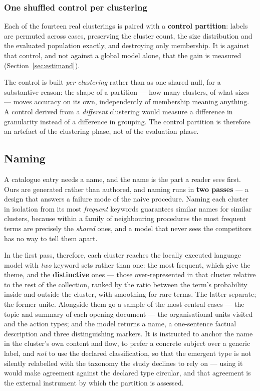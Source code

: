 \subsubsection{One shuffled control per clustering}\label{sec:controls}

Each of the fourteen real clusterings is paired with a \textbf{control partition}: labels are
permuted across cases, preserving the cluster count, the size distribution and the evaluated
population exactly, and destroying only membership. It is against that control, and not against
a global model alone, that the gain is measured (Section~\ref{sec:estimand}).

The control is built \emph{per clustering} rather than as one shared null, for a substantive
reason: the shape of a partition --- how many clusters, of what sizes --- moves accuracy on its
own, independently of membership meaning anything. A control derived from a \emph{different}
clustering would measure a difference in granularity instead of a difference in grouping. The
control partition is therefore an artefact of the clustering phase, not of the evaluation phase.

\subsection{Naming}\label{sec:naming}

A catalogue entry needs a name, and the name is the part a reader sees first. Ours are generated
rather than authored, and naming runs in \textbf{two passes} --- a design that answers a failure
mode of the naive procedure. Naming each cluster in isolation from its most \emph{frequent}
keywords guarantees similar names for similar clusters, because within a family of neighbouring
procedures the most frequent terms are precisely the \emph{shared} ones, and a model that never
sees the competitors has no way to tell them apart.

In the first pass, therefore, each cluster reaches the locally executed language model with
\emph{two} keyword sets rather than one: the most frequent, which give the theme, and the
\textbf{distinctive} ones --- those over-represented in that cluster relative to the rest of the
collection, ranked by the ratio between the term's probability inside and outside the cluster,
with smoothing for rare terms. The latter separate; the former unite. Alongside them go a sample
of the most central cases --- the topic and summary of each opening document --- the
organisational units visited and the action types; and the model returns a name, a one-sentence
factual description and three distinguishing markers. It is instructed to anchor the name in the
cluster's own content and flow, to prefer a concrete subject over a generic label, and \emph{not}
to use the declared classification, so that the emergent type is not silently relabelled with the
taxonomy the study declines to rely on --- using it would make agreement against the declared
type circular, and that agreement is the external instrument by which the partition is assessed.

